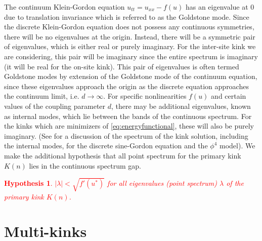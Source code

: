 \documentclass[12pt,reqno]{amsart}
\newtheorem{hypothesis}{Hypothesis}
\newcommand{\revised}[1]{ \textcolor{red}{#1} }
\begin{document}
The continuum Klein-Gordon equation $u_{tt} = u_{xx} - f(u)$ has an eigenvalue at 0 due to translation invariance which is referred to as the Goldstone mode. Since the discrete Klein-Gordon equation does not possess any continuous symmetries, there will be no eigenvalues at the origin. Instead, there will be a symmetric pair of eigenvalues, which is either real or purely imaginary. For the inter-site kink we are considering, this pair will be imaginary since the entire spectrum is imaginary (it will be real for the on-site kink). This pair of eigenvalues is often termed Goldstone modes by extension of the Goldstone mode of the continuum equation, since these eigenvalues approach the origin as the discrete equation approaches the continuum limit, i.e. $d \rightarrow \infty$. For specific nonlinearities $f(u)$ and certain values of the coupling parameter $d$, there may be additional eigenvalues, known as internal modes, which lie between the bands of the continuous spectrum. For the kinks which are minimizers of \cref{eq:energyfunctional}, these will also be purely imaginary. (See \cites{cretegny,KevrekidisWeinstein2000}
for a discussion of the spectrum of the kink solution, including the internal modes, for the discrete sine-Gordon equation and the $\phi^4$ model). We make the additional hypothesis that all point spectrum for the primary kink $K(n)$ lies in the continuous spectrum gap.

\revised{
\begin{hypothesis}\label{hyp:pointspecgap}
$|\lambda| < \sqrt{f'(u^*)}$ for all eigenvalues (point spectrum) $\lambda$ of the primary kink $K(n)$.
\end{hypothesis}
}

\section{Multi-kinks}\label{sec:multikink}
\end{document}
